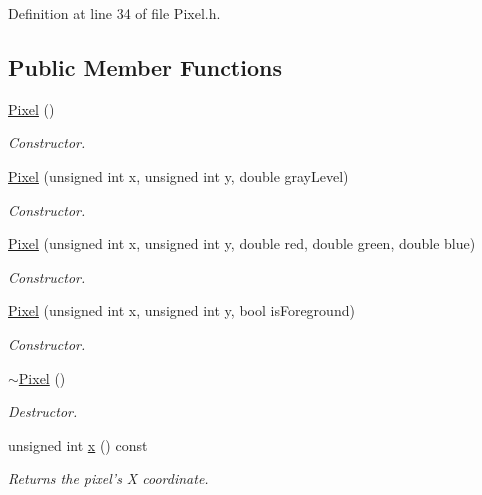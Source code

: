 Definition at line 34 of file Pixel.h.\subsection*{Public Member Functions}
\begin{CompactItemize}
\item 
\hyperlink{class_pixel_27ad99a2f705e635c42d242d530d4756}{Pixel} ()
\begin{CompactList}\small\item\em Constructor. \item\end{CompactList}\item 
\hyperlink{class_pixel_dfa33daefa83d3ac471af91fb32f8997}{Pixel} (unsigned int x, unsigned int y, double grayLevel)
\begin{CompactList}\small\item\em Constructor. \item\end{CompactList}\item 
\hyperlink{class_pixel_e5ca1376e87442aea5968a17a4240814}{Pixel} (unsigned int x, unsigned int y, double red, double green, double blue)
\begin{CompactList}\small\item\em Constructor. \item\end{CompactList}\item 
\hyperlink{class_pixel_3138f81f8e7ea10f6764f47136129ad0}{Pixel} (unsigned int x, unsigned int y, bool isForeground)
\begin{CompactList}\small\item\em Constructor. \item\end{CompactList}\item 
\hyperlink{class_pixel_30f6aaf9a1d8792245070860546fa365}{$\sim$Pixel} ()
\begin{CompactList}\small\item\em Destructor. \item\end{CompactList}\item 
unsigned int \hyperlink{class_pixel_68dafccc4588fb33d445641c2766316b}{x} () const 
\begin{CompactList}\small\item\em Returns the pixel's X coordinate. \item\end{CompactList}\item 

\end{CompactItemize}

